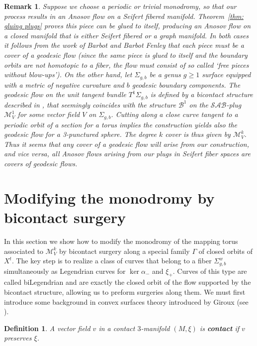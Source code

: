 \documentclass{amsart}
\newtheorem{definition}[theorem]{Definition}
\newtheorem{remark}[theorem]{Remark}
\theoremstyle{definition}
\theoremstyle{remark}
\begin{document}
\begin{remark}\label{rmk:relation to geodesic flows}
Suppose we choose a periodic or trivial monodromy, so that our process results in an Anosov flow on a Seifert fibered manifold. Theorem~\ref{thm: gluing plugs} proves this piece can be glued to itself, producing an Anosov flow on a closed manifold that is either Seifert fibered or a graph manifold. In both cases it follows from the work of Barbot \cite{Barbot96} and Barbot Fenley \cite{BaFe4} that each piece must be a cover of a geodesic flow (since the same piece is glued to itself and the boundary orbits are not homotopic to a fiber, the flow must consist of so called `free pieces without blow-ups').
On the other hand, let $\Sigma_{g,b}$ be a genus $g\geq 1$ surface equipped with a metric of negative curvature and $b$ geodesic boundary components. The geodesic flow on the unit tangent bundle $T^1\Sigma_{g,b}$ is defined by a bicontact structure described in \cite{FHV2}, that seemingly coincides with the structure $\mathcal{B}^1$ on the $\mathcal{SAB}$-plug $\mathcal{M}^1_V$ for some vector field $V$ on $\Sigma_{g,b}$. 
Cutting along a close curve tangent to a periodic orbit of a section for a torus implies the construction yields also the geodesic flow for a 3-punctured sphere.
The degree $k$ cover is thus given by $\mathcal{M}^k_V$. Thus it seems that any cover of a geodesic flow will arise from our construction, and vice versa, all Anosov flows arising from our plugs in Seifert fiber spaces are covers of geodesic flows.
\end{remark}




\section{Modifying the monodromy by bicontact surgery}

In this section we show how to modify the monodromy of the mapping torus associated to $\mathcal{M}^k_V$ by bicontact surgery along a special family $\Gamma$ of closed orbits of $X^t$. The key step is to realize a class of curves that belong to a fiber $\Sigma^w_{g,b}$ simultaneously as Legendrian curves for $\ker \alpha_-$ and $\xi_+$. Curves of this type are called biLegendrian and are exactly the closed orbit of the flow supported by the bicontact structure, allowing us to preform surgeries along them. We must first introduce some background in convex surfaces theory introduced by Giroux (see \cite{Gir01}).

\begin{definition}
    A vector field $v$ in a contact $3$-manifold $(M,\xi)$ is \textbf{contact} if $v$ preserves $\xi$.
\end{definition}
\end{document}
